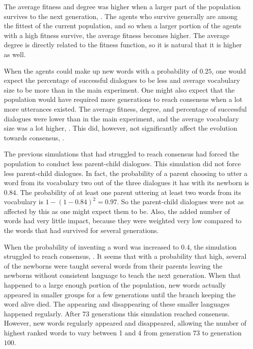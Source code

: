 The average fitness and degree was higher when a larger part of the population survives to the next generation, . The agents who survive generally are among the fittest of the current population, and so when a larger portion of the agents with a high fitness survive, the average fitness becomes higher. The average degree is directly related to the fitness function, so it is natural that it is higher as well. 

When the agents could make up new words with a probability of $0.25$, one would expect the percentage of successful dialogues to be less and average vocabulary size to be more than in the main experiment. One might also expect that the population would have required more generations to reach consensus when a lot more utterances existed. The average fitness, degree, and percentage of successful dialogues were lower than in the main experiment, and the average vocabulary size was a lot higher, . This did, however, not significantly affect the evolution towards consensus, . 

The previous simulations that had struggled to reach consensus had forced the population to conduct less parent-child dialogues. This simulation did not force less parent-child dialogues. In fact, the probability of a parent choosing to utter a word from its vocabulary two out of the three dialogues it has with its newborn is $0.84$. The probability of at least one parent uttering at least two words from its vocabulary is $1 - (1-0.84)^2 = 0.97$. So the parent-child dialogues were not as affected by this as one might expect them to be. Also, the added number of words had very little impact, because they were weighted very low compared to the words that had survived for several generations. 

When the probability of inventing a word was increased to $0.4$, the simulation struggled to reach consensus, . It seems that with a probability that high, several of the newborns were taught several words from their parents leaving the newborns without consistent language to teach the next generation. When that happened to a large enough portion of the population, new words actually appeared in smaller groups for a few generations until the branch keeping the word alive died. The appearing and disappearing of these smaller languages happened regularly. After $73$ generations this simulation reached consensus. However, new words regularly appeared and disappeared, allowing the number of highest ranked words to vary between 1 and 4 from generation $73$ to generation $100$.